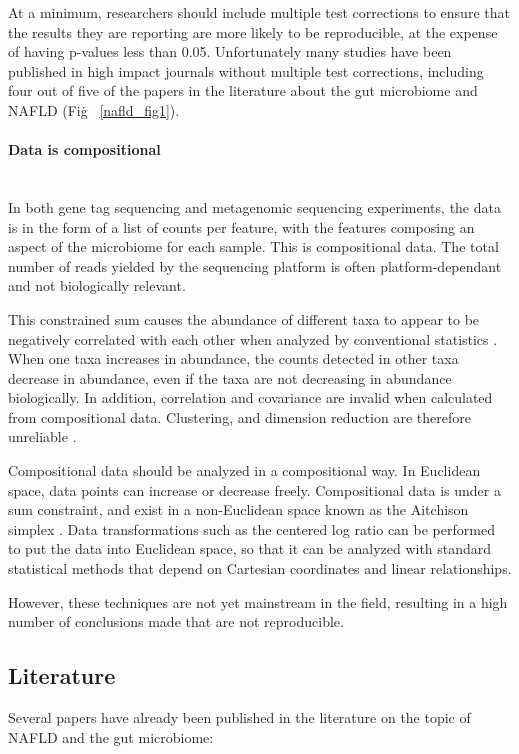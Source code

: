 At a minimum, researchers should include multiple test corrections to ensure that the results they are reporting are more likely to be reproducible, at the expense of having p-values less than 0.05. Unfortunately many studies have been published in high impact journals without multiple test corrections, including four out of five of the papers in the literature about the gut microbiome and NAFLD (Fig\. ~\ref{nafld_fig1}).

\paragraph{Data is compositional}\mbox{}\\
In both gene tag sequencing and metagenomic sequencing experiments, the data is in the form of a list of counts per feature, with the features composing an aspect of the microbiome for each sample. This is compositional data. The total number of reads yielded by the sequencing platform is often platform-dependant and not biologically relevant.

This constrained sum causes the abundance of different taxa to appear to be negatively correlated with each other when analyzed by conventional statistics \cite{gloor2016s}. When one taxa increases in abundance, the counts detected in other taxa decrease in abundance, even if the taxa are not decreasing in abundance biologically. In addition, correlation and covariance are invalid when calculated from compositional data. Clustering, and dimension reduction are therefore unreliable \cite{lovell2015proportionality}.

Compositional data should be analyzed in a compositional way. In Euclidean space, data points can increase or decrease freely. Compositional data is under a sum constraint, and exist in a non-Euclidean space known as the Aitchison simplex \cite{aitchison1982statistical}. Data transformations such as the centered log ratio can be performed to put the data into Euclidean space, so that it can be analyzed with standard statistical methods that depend on Cartesian coordinates and linear relationships.

However, these techniques are not yet mainstream in the field, resulting in a high number of conclusions made that are not reproducible.

\subsection{Literature}
Several papers have already been published in the literature on the topic of NAFLD and the gut microbiome:

